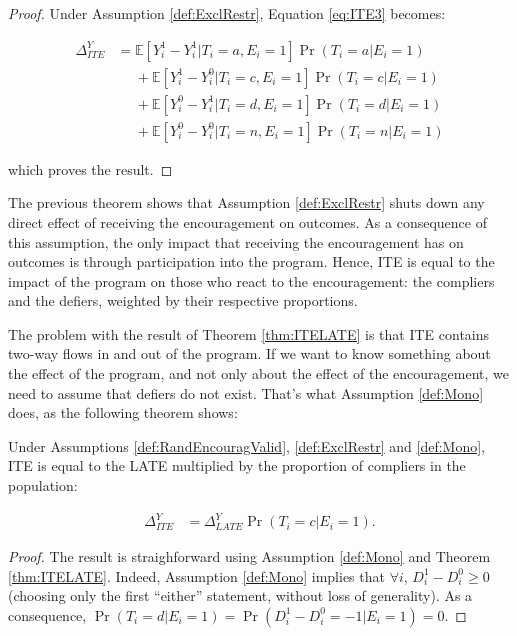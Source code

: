 \documentclass[]{book}
\newcommand{\esp}[1]{\mathbb{E}[ #1 ]}
\theoremstyle{definition}
\theoremstyle{definition}
\theoremstyle{definition}
\theoremstyle{remark}
\let\BeginKnitrBlock\begin \let\EndKnitrBlock\end
\begin{document}
\BeginKnitrBlock{proof}
\iffalse{} {Proof. } \fi{}Under Assumption \ref{def:ExclRestr}, Equation \eqref{eq:ITE3} becomes:

\begin{align*}
  \Delta^Y_{ITE} & = \esp{Y_i^{1}-Y_i^{1}|T_i=a,E_i=1}\Pr(T_i=a|E_i=1)\\
                & \phantom{=}+ \esp{Y_i^{1}-Y_i^{0}|T_i=c,E_i=1}\Pr(T_i=c|E_i=1)\\
                & \phantom{=}+ \esp{Y_i^{0}-Y_i^{1}|T_i=d,E_i=1}\Pr(T_i=d|E_i=1)\\
                & \phantom{=}+ \esp{Y_i^{0}-Y_i^{0}|T_i=n,E_i=1}\Pr(T_i=n|E_i=1)
\end{align*}

which proves the result.
\EndKnitrBlock{proof}

The previous theorem shows that Assumption \ref{def:ExclRestr} shuts down any direct effect of receiving the encouragement on outcomes.
As a consequence of this assumption, the only impact that receiving the encouragement has on outcomes is through participation into the program.
Hence, ITE is equal to the impact of the program on those who react to the encouragement: the compliers and the defiers, weighted by their respective proportions.

The problem with the result of Theorem \ref{thm:ITELATE} is that ITE contains two-way flows in and out of the program.
If we want to know something about the effect of the program, and not only about the effect of the encouragement, we need to assume that defiers do not exist.
That's what Assumption \ref{def:Mono} does, as the following theorem shows:

\BeginKnitrBlock{theorem}[From ITE to LATE]
\protect\hypertarget{thm:ITELATEMono}{}{\label{thm:ITELATEMono} \iffalse (From ITE to LATE) \fi{} }Under Assumptions \ref{def:RandEncouragValid}, \ref{def:ExclRestr} and \ref{def:Mono}, ITE is equal to the LATE multiplied by the proportion of compliers in the population:

\begin{align*}
  \Delta^Y_{ITE} & = \Delta^Y_{LATE}\Pr(T_i=c|E_i=1).
\end{align*}
\EndKnitrBlock{theorem}

\BeginKnitrBlock{proof}
\iffalse{} {Proof. } \fi{}The result is straighforward using Assumption \ref{def:Mono} and Theorem \ref{thm:ITELATE}.
Indeed, Assumption \ref{def:Mono} implies that \(\forall i\), \(D_i^1-D_i^0\geq 0\) (choosing only the first ``either'' statement, without loss of generality).
As a consequence, \(\Pr(T_i=d|E_i=1)=\Pr(D_i^1-D_i^0=-1|E_i=1)=0\).
\EndKnitrBlock{proof}
\end{document}
